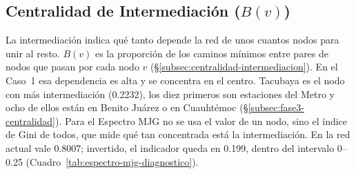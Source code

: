 %
\subsection{Centralidad de Intermediación (\texorpdfstring{$B(v)$}{B(v)})}
\label{subsec:anillo-centralidad}

La intermediación indica qué tanto depende la red de unos cuantos nodos para
unir al resto. $B(v)$ es la proporción de los caminos mínimos entre pares de
nodos que pasan por cada nodo $v$ (§\ref{subsec:centralidad-intermediacion}).
En el Caso~1 esa dependencia es alta y se concentra en el centro. Tacubaya es
el nodo con más intermediación (0.2232), los diez primeros son estaciones del
Metro y ocho de ellos están en Benito Juárez o en Cuauhtémoc
(§\ref{subsec:fase3-centralidad}). Para el Espectro MJG no se usa el valor de
un nodo, sino el índice de Gini de todos, que mide qué tan concentrada está la
intermediación. En la red actual vale 0.8007; invertido, el indicador queda en
0.199, dentro del intervalo 0--0.25 (Cuadro~\ref{tab:espectro-mjg-diagnostico}).

